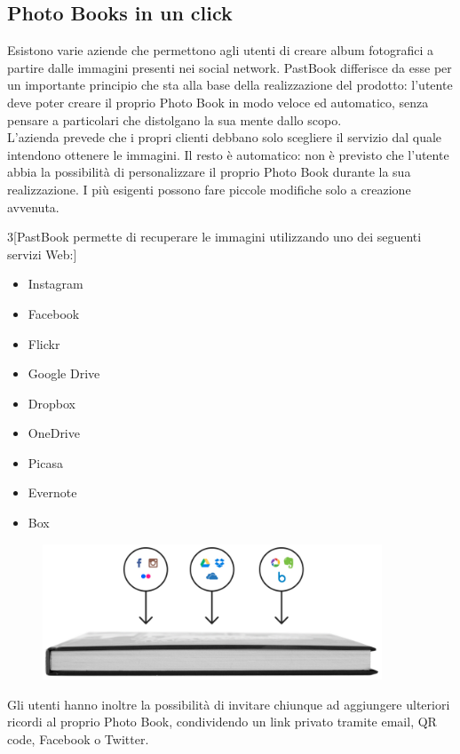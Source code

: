 		\subsection{Photo Books in un click}
			Esistono varie aziende che permettono agli utenti di creare album fotografici a partire dalle immagini presenti nei social
			network. PastBook differisce da esse per un importante principio che sta alla base della realizzazione del prodotto: l'utente
			deve poter creare il proprio Photo Book in modo veloce ed automatico, senza pensare a particolari che distolgano la sua mente
			dallo scopo.\\
			L'azienda prevede che i propri clienti debbano solo scegliere il servizio dal quale intendono ottenere le immagini. Il resto
			è automatico: non è previsto che l'utente abbia la possibilità di personalizzare il proprio Photo Book durante la sua
			realizzazione. I più esigenti possono fare piccole modifiche solo a creazione avvenuta.\\
			\begin{multicols}{3}[\noindent PastBook permette di recuperare le immagini utilizzando uno dei seguenti servizi Web:]
				\begin{itemize}
					\item Instagram
					\item Facebook
					\item Flickr
					\item Google Drive
					\item Dropbox
					\item OneDrive
					\item Picasa
					\item Evernote
					\item Box
				\end{itemize}
			\end{multicols}
			\begin{figure}
				\centering
				\includegraphics[width=0.9\textwidth]{capitolo_1/immagini/photo_book_one_click.png}
			\end{figure}
			Gli utenti hanno inoltre la possibilità di invitare chiunque ad aggiungere ulteriori ricordi al proprio Photo Book,
			condividendo un link privato tramite email, QR code, Facebook o Twitter.
